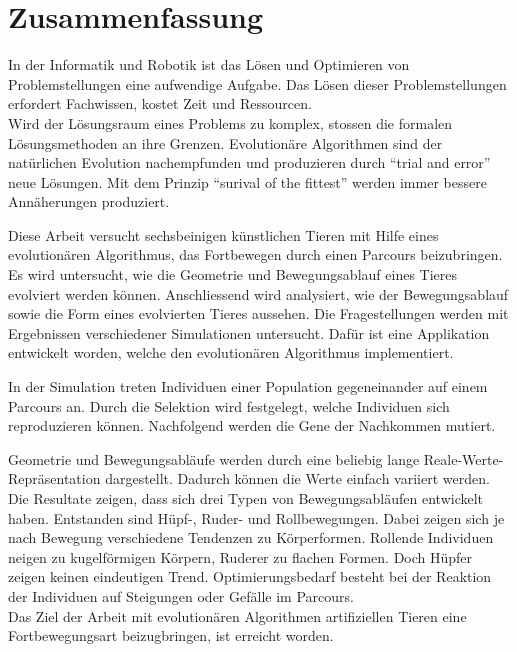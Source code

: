 %
%


\chapter{Zusammenfassung}

  In der Informatik und Robotik ist das Lösen und Optimieren von Problemstellungen eine aufwendige Aufgabe.
  Das Lösen dieser Problemstellungen erfordert Fachwissen, kostet Zeit und Ressourcen. \\
  Wird der Lösungsraum eines Problems zu komplex, stossen die formalen Lösungsmethoden an ihre Grenzen.
  Evolutionäre Algorithmen sind der natürlichen Evolution nachempfunden und
  produzieren durch ``trial and error'' neue Lösungen.
  Mit dem Prinzip ``surival of the fittest'' werden immer bessere Annäherungen produziert.

  \smallskip

  Diese Arbeit versucht sechsbeinigen künstlichen Tieren mit Hilfe eines evolutionären Algorithmus,
  das Fortbewegen durch einen Parcours beizubringen.
  Es wird untersucht, wie die Geometrie und Bewegungsablauf eines Tieres evolviert werden können.
  Anschliessend wird analysiert, wie der Bewegungsablauf sowie die Form eines evolvierten Tieres aussehen.
  Die Fragestellungen werden mit Ergebnissen verschiedener Simulationen untersucht.
  Dafür ist eine Applikation entwickelt worden, welche den evolutionären Algorithmus implementiert.

  \smallskip

  In der Simulation treten Individuen einer Population gegeneinander auf einem Parcours an.
  Durch die Selektion wird festgelegt, welche Individuen sich reproduzieren können.
  Nachfolgend werden die Gene der Nachkommen mutiert.

  \smallskip

  Geometrie und Bewegungsabläufe werden durch eine beliebig lange Reale-Werte-Repräsentation dargestellt.
  Dadurch können die Werte einfach variiert werden.
  Die Resultate zeigen, dass sich drei Typen von Bewegungsabläufen entwickelt haben.
  Entstanden sind Hüpf-, Ruder- und Rollbewegungen.
  Dabei zeigen sich je nach Bewegung verschiedene Tendenzen zu Körperformen.
  Rollende Individuen neigen zu kugelförmigen Körpern, Ruderer zu flachen Formen.
  Doch Hüpfer zeigen keinen eindeutigen Trend.
  Optimierungsbedarf besteht bei der Reaktion der Individuen auf Steigungen oder Gefälle im Parcours.
  \\
  Das Ziel der Arbeit mit evolutionären Algorithmen artifiziellen Tieren eine Fortbewegungsart beizugbringen, ist erreicht worden.
